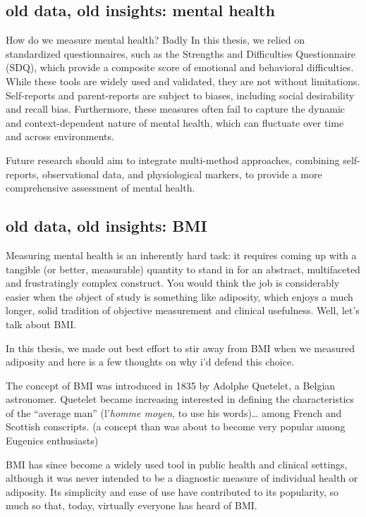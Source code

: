 \documentclass[
  letterpaper,
  DIV=11,
  numbers=noendperiod]{scrreport}
\begin{document}
\subsection{old data, old insights: mental
health}\label{old-data-old-insights-mental-health}

How do we measure mental health? Badly In this thesis, we relied on
standardized questionnaires, such as the Strengths and Difficulties
Questionnaire (SDQ), which provide a composite score of emotional and
behavioral difficulties. While these tools are widely used and
validated, they are not without limitations. Self-reports and
parent-reports are subject to biases, including social desirability and
recall bias. Furthermore, these measures often fail to capture the
dynamic and context-dependent nature of mental health, which can
fluctuate over time and across environments.

Future research should aim to integrate multi-method approaches,
combining self-reports, observational data, and physiological markers,
to provide a more comprehensive assessment of mental health.

\subsection{old data, old insights:
BMI}\label{old-data-old-insights-bmi}

Measuring mental health is an inherently hard task: it requires coming
up with a tangible (or better, measurable) quantity to stand in for an
abstract, multifaceted and frustratingly complex construct. You would
think the job is considerably easier when the object of study is
something like adiposity, which enjoys a much longer, solid tradition of
objective measurement and clinical usefulness. Well, let's talk about
BMI.

In this thesis, we made out best effort to stir away from BMI when we
measured adiposity and here is a few thoughts on why i'd defend this
choice.

The concept of BMI was introduced in 1835 by Adolphe Quetelet, a Belgian
astronomer. Quetelet became increasing interested in defining the
characteristics of the ``average man'' (l'\emph{homme moyen}, to use his
words)\ldots{} among French and Scottish conscripts. (a concept than was
about to become very popular among Eugenics enthusiasts)

BMI has since become a widely used tool in public health and clinical
settings, although it was never intended to be a diagnostic measure of
individual health or adiposity. Its simplicity and ease of use have
contributed to its popularity, so much so that, today, virtually
everyone has heard of BMI.
\end{document}
